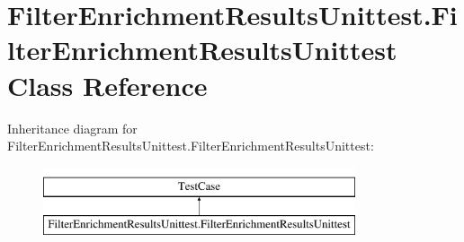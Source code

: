 \hypertarget{classFilterEnrichmentResultsUnittest_1_1FilterEnrichmentResultsUnittest}{\section{Filter\-Enrichment\-Results\-Unittest.\-Filter\-Enrichment\-Results\-Unittest Class Reference}
\label{classFilterEnrichmentResultsUnittest_1_1FilterEnrichmentResultsUnittest}
}
Inheritance diagram for Filter\-Enrichment\-Results\-Unittest.\-Filter\-Enrichment\-Results\-Unittest\-:\begin{figure}[H]
\begin{center}
\leavevmode
\includegraphics[height=2.000000cm]{classFilterEnrichmentResultsUnittest_1_1FilterEnrichmentResultsUnittest}
\end{center}
\end{figure}
